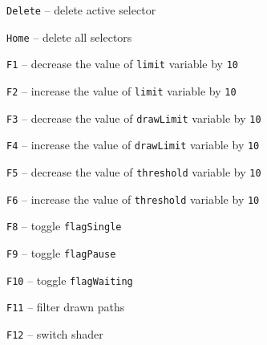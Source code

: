 \texttt{Delete} -- delete active selector

\texttt{Home} -- delete all selectors

\texttt{F1} -- decrease the value of \texttt{limit} variable by \texttt{10}

\texttt{F2} -- increase the value of \texttt{limit} variable by \texttt{10}

\texttt{F3}  -- decrease the value of \texttt{drawLimit} variable by \texttt{10}

\texttt{F4} -- increase the value of \texttt{drawLimit} variable by \texttt{10}

\texttt{F5} -- decrease the value of \texttt{threshold} variable by \texttt{10}

\texttt{F6} -- increase the value of \texttt{threshold} variable by \texttt{10}

\texttt{F8} -- toggle \texttt{flagSingle}

\texttt{F9} -- toggle \texttt{flagPause}

\texttt{F10} -- toggle \texttt{flagWaiting}

\texttt{F11} -- filter drawn paths

\texttt{F12} -- switch shader
